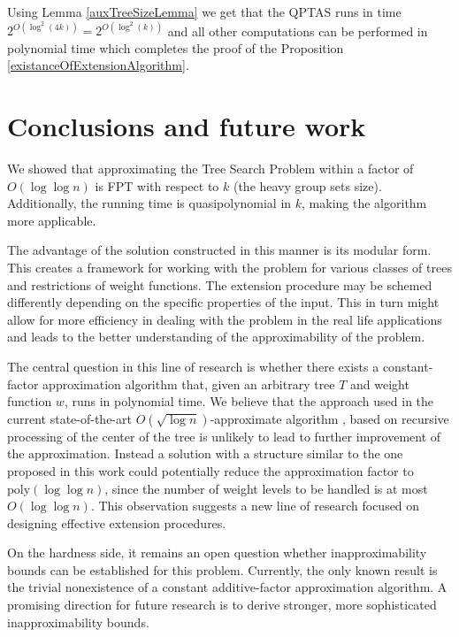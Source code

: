 \documentclass[a4paper, anonymous, numberwithinsect, pdfa, UKenglish,cleveref, autoref, thm-restate]{socg-lipics-v2021}
\newcommand{\br}[1]{\left( #1 \right)}
\begin{document}
Using Lemma \ref{auxTreeSizeLemma} we get that the QPTAS runs in time $2^{O\br{\log^2\br{4k}}}=2^{O\br{\log^2\br{k}}}$ and all other computations can be performed in polynomial time which completes the proof of the Proposition \ref{existanceOfExtensionAlgorithm}.

\section{Conclusions and future work}

We showed that approximating the Tree Search Problem within a factor of $O\br{\log\log n}$ is FPT with respect to $k$ (the heavy group sets size). Additionally, the running time is quasipolynomial in $k$, making the algorithm more applicable.

The advantage of the solution constructed in this manner is its modular form. This creates a framework for working with the problem for various classes of trees and restrictions of weight functions. The extension procedure may be schemed differently depending on the specific properties of the input. This in turn might allow for more efficiency in dealing with the problem in the real life applications and leads to the better understanding of the approximability of the problem.

The central question in this line of research is whether there exists a constant-factor approximation algorithm that, given an arbitrary tree $T$ and weight function $w$, runs in polynomial time. We believe that the approach used in the current state-of-the-art $O\br{\sqrt{\log n}}$-approximate algorithm  \cite{dereniowski2017ApproxSsForGeneralBSinWTs}, based on recursive processing of the center of the tree is unlikely to lead to further improvement of the approximation. Instead a solution with a structure similar to the one proposed in this work could potentially reduce the approximation factor to $\text{poly}\br{\log \log n}$, since the number of weight levels to be handled is at most $O\br{\log \log n}$. This observation suggests a new line of research focused on designing effective extension procedures.

On the hardness side, it remains an open question whether inapproximability bounds can be established for this problem. Currently, the only known result is the trivial nonexistence of a constant additive-factor approximation algorithm. A promising direction for future research is to derive stronger, more sophisticated inapproximability bounds.





\end{document}
